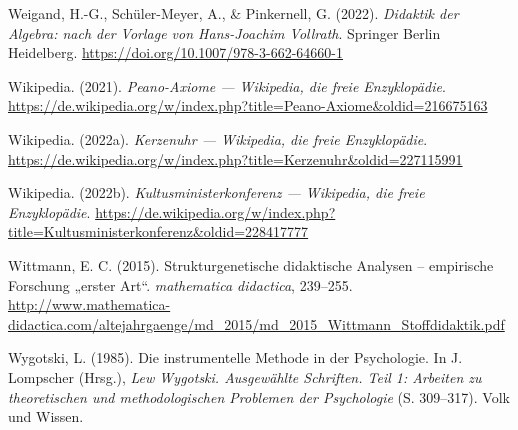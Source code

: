 \documentclass[
]{scrbook}
\newlength{\cslhangindent}
\newenvironment{CSLReferences}[2] %
 {\begin{list}{}{%
  \setlength{\itemindent}{0pt}
  \setlength{\leftmargin}{0pt}
  \setlength{\parsep}{0pt}
  \ifodd #1
   \setlength{\leftmargin}{\cslhangindent}
   \setlength{\itemindent}{-1\cslhangindent}
  \fi
  \setlength{\itemsep}{#2\baselineskip}}}
 {\end{list}}
\theoremstyle{definition}
\theoremstyle{definition}
\theoremstyle{definition}
\theoremstyle{definition}
\theoremstyle{remark}
\begin{document}
\begin{CSLReferences}{1}{0}
Weigand, H.-G., Schüler-Meyer, A., \& Pinkernell, G. (2022). \emph{Didaktik der {Algebra}: nach der {Vorlage} von {Hans}-{Joachim} {Vollrath}}. Springer Berlin Heidelberg. \url{https://doi.org/10.1007/978-3-662-64660-1}

Wikipedia. (2021). \emph{Peano-Axiome --- Wikipedia{,} die freie Enzyklopädie}. \url{https://de.wikipedia.org/w/index.php?title=Peano-Axiome&oldid=216675163}

Wikipedia. (2022a). \emph{Kerzenuhr --- Wikipedia{,} die freie Enzyklopädie}. \url{https://de.wikipedia.org/w/index.php?title=Kerzenuhr&oldid=227115991}

Wikipedia. (2022b). \emph{Kultusministerkonferenz --- Wikipedia{,} die freie Enzyklopädie}. \url{https://de.wikipedia.org/w/index.php?title=Kultusministerkonferenz&oldid=228417777}

Wittmann, E. C. (2015). Strukturgenetische didaktische {Analysen} -- empirische {Forschung} „erster {Art}``. \emph{mathematica didactica}, 239--255. \url{http://www.mathematica-didactica.com/altejahrgaenge/md_2015/md_2015_Wittmann_Stoffdidaktik.pdf}

Wygotski, L. (1985). Die instrumentelle {Methode} in der {Psychologie}. In J. Lompscher (Hrsg.), \emph{Lew {Wygotski}. {Ausgewählte} {Schriften}. {Teil} 1: {Arbeiten} zu theoretischen und methodologischen {Problemen} der {Psychologie}} (S. 309--317). Volk und Wissen.

\end{CSLReferences}

\end{document}
